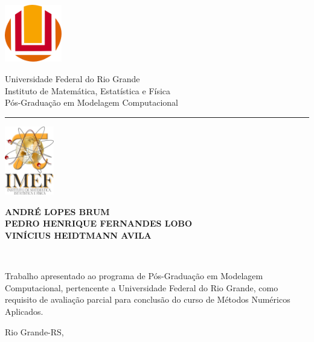 \documentclass[
		12pt,            %
		a4paper
	      ]  
	      {article}          %
\newcommand{\authorA}{André Lopes Brum}
\newcommand{\authorB}{Pedro Henrique Fernandes Lobo}
\newcommand{\authorC}{Vinícius Heidtmann Avila}
\begin{document}
		\begin{titlepage}	
	
	\makeatletter

	\noindent%
		\includegraphics[height=25.0mm]{logoFurg.png}
		\begin{minipage}[b]{0.7\textwidth}
			\centering
			{\Large Universidade Federal do Rio Grande} \\
			\vspace{1.5mm}
			{Instituto de Matemática, Estatística e Física} \\
			\vspace{0.5mm}
			{\sc Pós-Graduação em Modelagem Computacional} \\
			\vspace{0.2mm}
			\centering\rule{0.95\textwidth}{1pt}
		\end{minipage}
		\includegraphics[height=30.0mm, clip, trim = 10mm  0 0 0]{logoIMEF.jpg}
		\begin{center}	
			{\bf\small \MakeUppercase{\authorA}}\\		 
			{\bf\small \MakeUppercase{\authorB}}\\		 
			{\bf\small \MakeUppercase{\authorC}}\\
		\end{center}
			\vspace{5cm}
		\begin{center}
			{\bf\large \MakeUppercase{\@title}} \\
		\end{center}
	
			\vspace{10mm}
			
			\begin{flushright}
			\begin{minipage}[t]{0.5\textwidth}
				\setlength{\parindent}{0mm}
				Trabalho apresentado ao programa de Pós-Graduação em Modelagem 
				Computacional, pertencente a Universidade Federal do Rio Grande, 
				como requisito de avaliação parcial para conclusão do curso de 
				Métodos Numéricos Aplicados.
			\end{minipage}	
			\end{flushright}

			\vspace{15mm}
			\vfill	
			\begin{center}
				Rio Grande-RS, \the\year 
			\end{center}
			\makeatother
	
		\end{titlepage}
		\cleardoublepage
\end{document}

